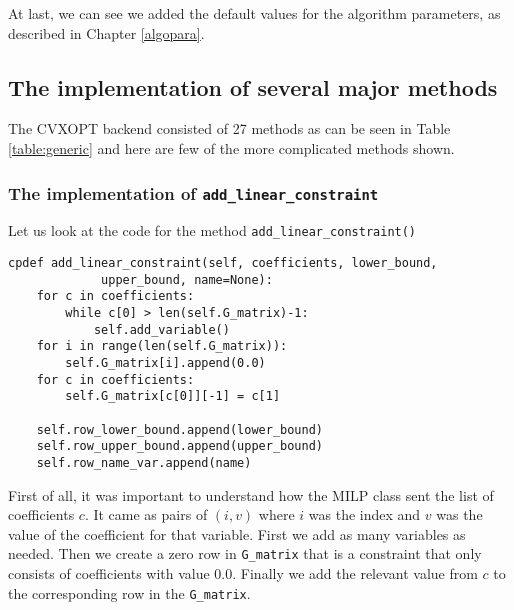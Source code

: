 At last, we can see we added the default values for the algorithm parameters, as described in Chapter \ref{algopara}.


\subsection{The implementation of several major methods}
The CVXOPT backend consisted of 27 methods as can be seen in Table \ref{table:generic} and here are few of the more complicated methods shown.


\subsubsection{The implementation of \texttt{add\_linear\_constraint}}
Let us look at the code for the method \texttt{add\_linear\_constraint()}
\begin{verbatim}
cpdef add_linear_constraint(self, coefficients, lower_bound,
			 upper_bound, name=None):
    for c in coefficients:
        while c[0] > len(self.G_matrix)-1:
            self.add_variable()             
    for i in range(len(self.G_matrix)): 
        self.G_matrix[i].append(0.0)    
    for c in coefficients:
        self.G_matrix[c[0]][-1] = c[1]  
  
    self.row_lower_bound.append(lower_bound)
    self.row_upper_bound.append(upper_bound)
    self.row_name_var.append(name) 
\end{verbatim}

First of all, it was important to understand how the MILP class sent the list of coefficients $c$. It came as pairs of $(i,v)$ where $i$ was the index and $v$ was the value of the coefficient for that variable. First we add as many variables as needed. Then we create a zero row in \texttt{G\_matrix} that is a constraint that only consists of coefficients with value 0.0. Finally we add the relevant value from $c$ to the corresponding row in the \texttt{G\_matrix}. 






